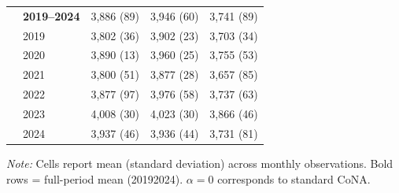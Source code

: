 \begin{table}[htbp]
\begin{tabular}{llrrr}
 & \textbf{2019–2024} & 3,886 (89) & 3,946 (60) & 3,741 (89) \\
 & 2019 & 3,802 (36) & 3,902 (23) & 3,703 (34) \\
 & 2020 & 3,890 (13) & 3,960 (25) & 3,755 (53) \\
 & 2021 & 3,800 (51) & 3,877 (28) & 3,657 (85) \\
 & 2022 & 3,877 (97) & 3,976 (58) & 3,737 (63) \\
 & 2023 & 4,008 (30) & 4,023 (30) & 3,866 (46) \\
 & 2024 & 3,937 (46) & 3,936 (44) & 3,731 (81) \\
\bottomrule
\end{tabular}
\begin{minipage}{\linewidth}
\vspace{2pt}\footnotesize
\textit{Note:} Cells report mean (standard deviation) across monthly observations. Bold rows = full-period mean (2019\textendash{}2024). $\alpha = 0$ corresponds to standard CoNA.
\end{minipage}
\end{table}
